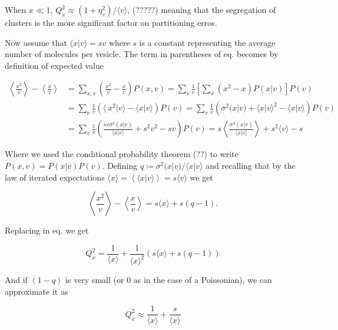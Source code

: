When $x\ll 1$, $Q_x^2\approx(1+\eta_v^2)/\langle v\rangle$, (?????) meaning that the segregation of clusters is the more significant factor on partitioning erros.

Now assume that $\langle x|v\rangle = sv$ where $s$ is a constant representing the average number of molecules per vesicle. The term in parentheses of eq. \label{eq:div-clus-Qx2} becomes by definition of expected value

\begin{equation}
  \begin{split}
    \left\langle \frac{x^2}{v}\right\rangle-\left\langle \frac{x}{v}\right\rangle &= \sum_{x,v}\left( \frac{x^2}{v}- \frac{x}{v}\right)P(x,v) = \sum_v\frac{1}{v}\left[\sum_x\left(x^2- x\right)P(x|v)\right]P(v)\\
    &=\sum_v\frac{1}{v}\left(\langle\ x^2|v\rangle - \langle x|v\rangle\right)P(v)=\sum_v\frac{1}{v}\left(\sigma^2(x|v) + \langle x|v\rangle^2-\langle x|v\rangle\right)P(v)\\
    &=\sum_v\frac{1}{v}\left(\frac{sv\sigma^2(x|v)}{\langle x|v\rangle} + s^2v^2-sv\right)P(v) = s\left\langle\frac{\sigma^2(x|v)}{\langle x|v\rangle}\right\rangle + s^2\langle v\rangle - s
  \end{split}
\end{equation}

Where we used the conditional probability theorem (??) to write $P(x,v) = P(x|v)P(v)$. Defining $q\coloneqq\sigma^2(x|v)/\langle x|v\rangle$ and recalling that by the law of iterated expectations $\langle x\rangle = \left\langle\langle x|v\rangle\right\rangle = s\langle v\rangle$ we get

\begin{equation}
  \left\langle \frac{x^2}{v}\right\rangle-\left\langle \frac{x}{v}\right\rangle = s\langle x\rangle+s(q-1).
\end{equation}

Replacing in eq. \label{eq:div-clus-Qx2} we get

\begin{equation}
  Q_x^2 = \frac{1}{\langle x\rangle} + \frac{1}{\langle x\rangle^2}\left(s\langle x\rangle+s(q-1)\right)
\end{equation}

And if $(1-q)$ is very small (or $0$ as in the case of a Poissonian), we can approximate it as

\begin{equation}
  Q_x^2 \approx \frac{1}{\langle x\rangle} + \frac{s}{\langle x\rangle}
\end{equation}


